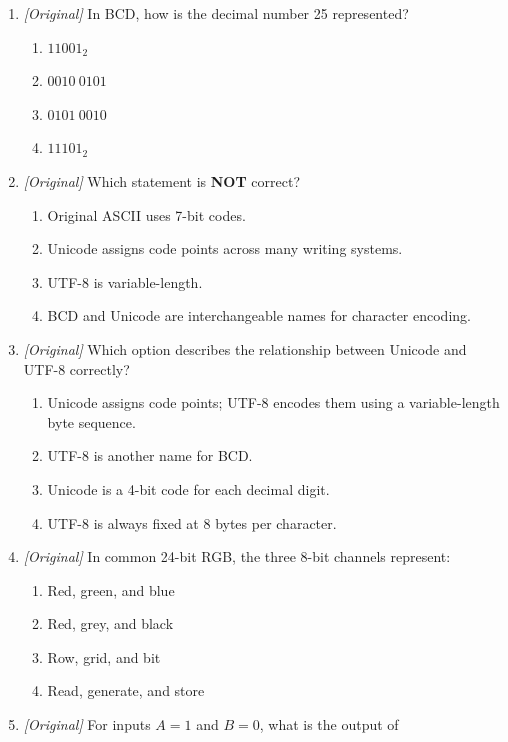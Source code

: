 \documentclass[11pt]{article}
\begin{document}
\begin{enumerate}[label=\textbf{Q\arabic*.}, leftmargin=*]
\begin{enumerate}[label=\Alph*.]
    \item $77_8$
    \item $177_{16}$
  \end{enumerate}
\item \textit{[Original]} In BCD, how is the decimal number 25 represented?
  \begin{enumerate}[label=\Alph*.]
    \item $11001_2$
    \item $0010\ 0101$
    \item $0101\ 0010$
    \item $11101_2$
  \end{enumerate}
\item \textit{[Original]} Which statement is \textbf{NOT} correct?
  \begin{enumerate}[label=\Alph*.]
    \item Original ASCII uses 7-bit codes.
    \item Unicode assigns code points across many writing systems.
    \item UTF-8 is variable-length.
    \item BCD and Unicode are interchangeable names for character encoding.
  \end{enumerate}
\item \textit{[Original]} Which option describes the relationship between
  Unicode and UTF-8 correctly?
  \begin{enumerate}[label=\Alph*.]
    \item Unicode assigns code points; UTF-8 encodes them using a
      variable-length byte sequence.
    \item UTF-8 is another name for BCD.
    \item Unicode is a 4-bit code for each decimal digit.
    \item UTF-8 is always fixed at 8 bytes per character.
  \end{enumerate}
\item \textit{[Original]} In common 24-bit RGB, the three 8-bit channels
  represent:
  \begin{enumerate}[label=\Alph*.]
    \item Red, green, and blue
    \item Red, grey, and black
    \item Row, grid, and bit
    \item Read, generate, and store
  \end{enumerate}
\item \textit{[Original]} For inputs $A=1$ and $B=0$, what is the output of

\end{enumerate}
\end{document}
